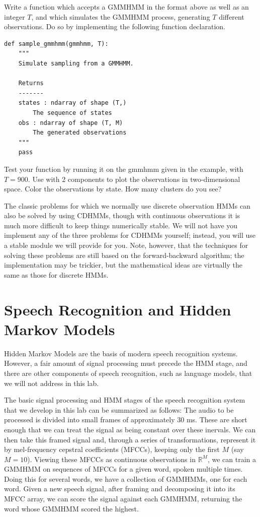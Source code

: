 \begin{problem}
Write a function which accepts a GMMHMM in the format above as well as an integer $T$, and which simulates the GMMHMM process, generating $T$ different observations.
Do so by implementing the following function declaration.
\begin{lstlisting}
def sample_gmmhmm(gmmhmm, T):
    """
    Simulate sampling from a GMMHMM.

    Returns
    -------
    states : ndarray of shape (T,)
        The sequence of states
    obs : ndarray of shape (T, M)
        The generated observations
    """
    pass
\end{lstlisting}

Test your function by running it on the gmmhmm given in the example, with $T=900$.
Use  with 2 components to plot the observations in two-dimensional space. 
Color the observations by state. How many clusters do you see?
\end{problem}

The classic problems for which we normally use discrete observation HMMs can also be solved by using CDHMMs, though with continuous observations it is much more difficult to keep things numerically stable.
We will not have you implement any of the three problems for CDHMMs yourself; instead, you will use a stable module we will provide for you.
Note, however, that the techniques for solving these problems are still based on the forward-backward algorithm; the implementation may be trickier, but the mathematical
ideas are virtually the same as those for discrete HMMs.

\section*{Speech Recognition and Hidden Markov Models}
Hidden Markov Models are the basis of modern speech recognition systems. However, a fair amount of signal processing must precede the HMM stage, and there are other
components of speech recognition, such as language models, that we will not address in this lab.

The basic signal processing and HMM stages of the speech recognition system that we develop in this lab can be summarized as follows:
The audio to be processed is divided into small frames of approximately $30$ ms. These are short enough that we can treat the signal as being constant over these inervals. We can then take this framed signal and, through a series of transformations, represent it by mel-frequency cepstral coefficients (MFCCs), keeping only the first $M$ (say $M = 10$). Viewing these MFCCs as continuous observations in $\mathbb{R}^{M}$, we can train a GMMHMM on sequences of MFCCs for a given word, spoken multiple times. Doing this for several words, we have a collection of GMMHMMs, one for each word. Given a new speech signal, after framing and decomposing it into its MFCC array, we can score the signal against each GMMHMM, returning the word whose GMMHMM scored the highest.

